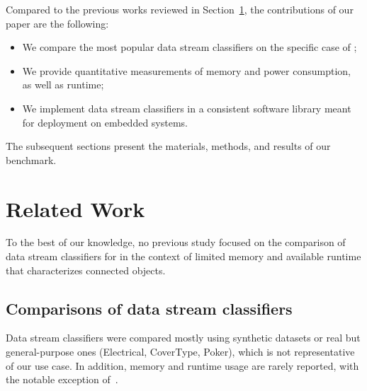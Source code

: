 Compared to the previous works reviewed in Section~\ref{sec:related-work}, the contributions of our paper are the following:
\begin{itemize}
    \item We compare the most popular data stream classifiers on the specific case of \har;
    \item We provide quantitative measurements of memory and power consumption, as well as runtime;
    \item We implement data stream classifiers in a consistent software library meant for deployment on embedded systems.
\end{itemize} 
The subsequent sections present the materials, methods, and results of our benchmark.


\section{Related Work}

\label{sec:related-work}

To the best of our knowledge, no previous study focused on the comparison
of data stream classifiers for \har in the context of limited memory and
available runtime that characterizes connected objects.

\subsection{Comparisons of data stream classifiers}

Data stream classifiers were compared mostly using synthetic datasets or real
but general-purpose ones (Electrical, CoverType, Poker), which is not
representative of our use case.  In addition, memory and runtime usage are rarely
reported, with the notable exception of~\cite{StreamDM-CPP}.

